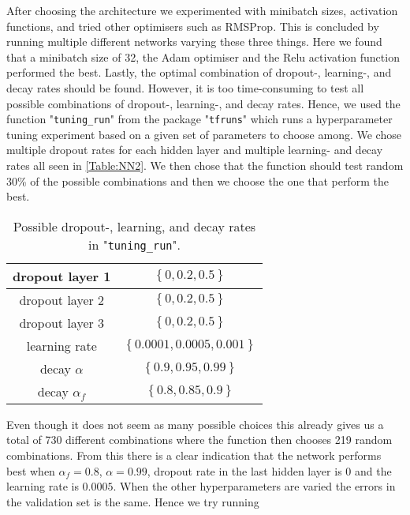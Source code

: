 After choosing the architecture we experimented with minibatch sizes, activation functions, and tried other optimisers such as RMSProp. This is concluded by running multiple different networks varying these three things. Here we found that a minibatch size of 32, the Adam optimiser and the Relu activation function performed the best. Lastly, the optimal combination of dropout-, learning-, and decay rates should be found. However, it is too time-consuming to test all possible combinations of dropout-, learning-, and decay rates. Hence, we used the function "\lstinline{tuning_run}" from the package "\lstinline{tfruns}" which runs a hyperparameter tuning experiment based on a given set of parameters to choose among. We chose multiple dropout rates for each hidden layer and multiple learning- and decay rates all seen in \autoref{Table:NN2}. We then chose that the function should test random 30\% of the possible combinations and then we choose the one that perform the best.
\begin{table}[H]
    \centering
    {\renewcommand{\arraystretch}{1.25}\begin{tabular}{c|c}
        dropout layer 1   & $\left\{0, 0.2, 0.5 \right\}$\\ \hline
        dropout layer 2  &  $\left\{0, 0.2, 0.5\right\}$\\ \hline
        dropout layer 3  &  $\left\{0, 0.2, 0.5\right\}$\\ \hline
        learning rate &  $\left\{0.0001, 0.0005, 0.001\right\}$\\ \hline
        decay $\alpha$ &  $\left\{0.9, 0.95, 0.99\right\}$\\ \hline
        decay $\alpha_f$ &  $\left\{0.8, 0.85, 0.9\right\}$\\ 
    \end{tabular}}
    \caption{Possible dropout-, learning, and decay rates in "\lstinline{tuning_run}".}
    \label{Table:NN2}
\end{table}

Even though it does not seem as many possible choices this already gives us a total of 730 different combinations where the function then chooses 219 random combinations. From this there is a clear indication that the network performs best when $\alpha_f = 0.8$, $\alpha = 0.99$, dropout rate in the last hidden layer is $0$ and the learning rate is $0.0005$. When the other hyperparameters are varied the errors in the validation set is the same. Hence we try running 



